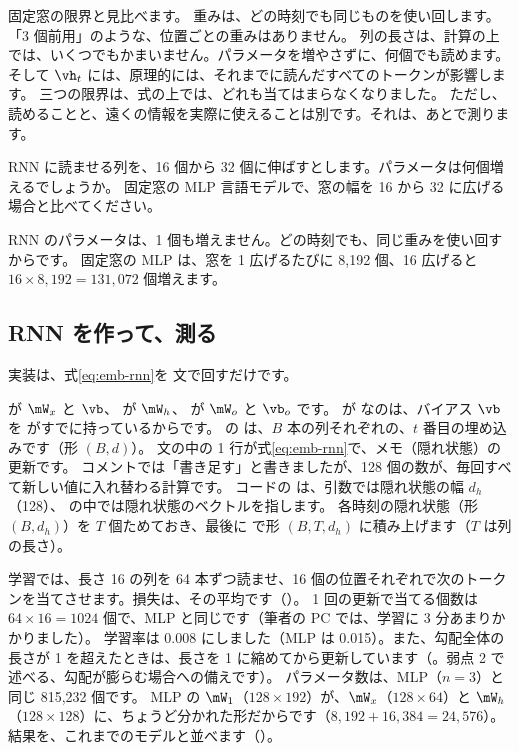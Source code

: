 固定窓の限界と見比べます。
重みは、どの時刻でも同じものを使い回します。「3 個前用」のような、位置ごとの重みはありません。
列の長さは、計算の上では、いくつでもかまいません。パラメータを増やさずに、何個でも読めます。
そして $\vh_t$ には、原理的には、それまでに読んだすべてのトークンが影響します。
三つの限界は、式の上では、どれも当てはまらなくなりました。
ただし、読めることと、遠くの情報を実際に使えることは別です。それは、あとで測ります。

\begin{quiz}
RNN に読ませる列を、16 個から 32 個に伸ばすとします。パラメータは何個増えるでしょうか。
固定窓の MLP 言語モデルで、窓の幅を 16 から 32 に広げる場合と比べてください。
\end{quiz}

RNN のパラメータは、1 個も増えません。どの時刻でも、同じ重みを使い回すからです。
固定窓の MLP は、窓を 1 広げるたびに 8,192 個、16 広げると $16\times8{,}192=131{,}072$ 個増えます。

\subsection*{RNN を作って、測る}\label{sec:emb-rnn-impl}

実装は、式\eqref{eq:emb-rnn}を  文で回すだけです。


 が $\mW_x$ と $\vb$、 が $\mW_h$、 が $\mW_o$ と $\vb_o$ です。
 が  なのは、バイアス $\vb$ を  がすでに持っているからです。
 の  は、$B$ 本の列それぞれの、$t$ 番目の埋め込みです（形 $(B,d)$）。
 文の中の 1 行が式\eqref{eq:emb-rnn}で、メモ（隠れ状態）の更新です。
コメントでは「書き足す」と書きましたが、128 個の数が、毎回すべて新しい値に入れ替わる計算です。
コードの  は、引数では隠れ状態の幅 $d_h$（128）、 の中では隠れ状態のベクトルを指します。
各時刻の隠れ状態（形 $(B,d_h)$）を $T$ 個ためておき、最後に  で形 $(B,T,d_h)$ に積み上げます（$T$ は列の長さ）。

学習では、長さ 16 の列を 64 本ずつ読ませ、16 個の位置それぞれで次のトークンを当てさせます。損失は、その平均です（）。
1 回の更新で当てる個数は $64\times16=1024$ 個で、MLP と同じです（筆者の PC では、学習に 3 分あまりかかりました）。
学習率は 0.008 にしました（MLP は 0.015）。また、勾配全体の長さが 1 を超えたときは、長さを 1 に縮めてから更新しています（。弱点 2 で述べる、勾配が膨らむ場合への備えです）。
パラメータ数は、MLP（$n=3$）と同じ 815,232 個です。
MLP の $\mW_1$（$128\times192$）が、$\mW_x$（$128\times64$）と $\mW_h$（$128\times128$）に、ちょうど分かれた形だからです（$8{,}192+16{,}384=24{,}576$）。
結果を、これまでのモデルと並べます（）。

